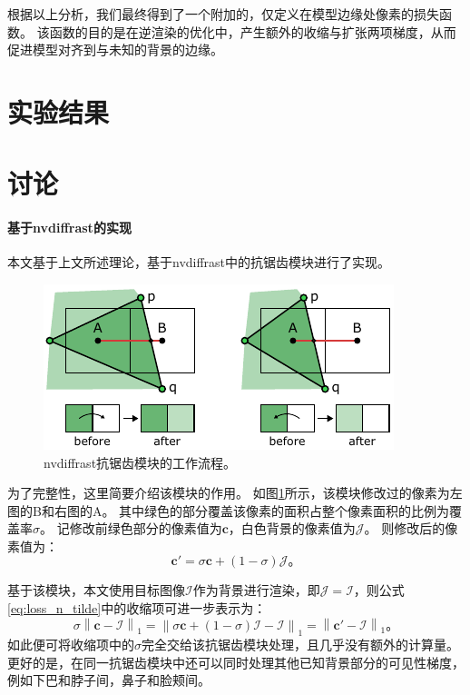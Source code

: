 根据以上分析，我们最终得到了一个附加的，仅定义在模型边缘处像素的损失函数。
该函数的目的是在逆渲染的优化中，产生额外的收缩与扩张两项梯度，从而促进模型对齐到与未知的背景的边缘。

\section{实验结果}


\section{讨论}
\label{sec:method_discuss}

\paragraph{基于nvdiffrast的实现}
本文基于上文所述理论，基于nvdiffrast\citep{nvdiffrast}中的抗锯齿模块进行了实现。

\begin{figure}
    \centering
    \includegraphics{figures/antialias}
    \caption[nvdiffrast抗锯齿模块的工作流程]{nvdiffrast抗锯齿模块的工作流程\citep{nvdiffrast}。}
    \label{fig:aa}
\end{figure}

为了完整性，这里简要介绍该模块的作用。
如图\ref{fig:aa}所示，该模块修改过的像素为左图的B和右图的A。
其中绿色的部分覆盖该像素的面积占整个像素面积的比例为覆盖率$\sigma$。
记修改前绿色部分的像素值为$\mathbf{c}$，白色背景的像素值为$\mathcal{J}$。
则修改后的像素值为：
\begin{equation}
\mathbf{c}' = \sigma\mathbf{c} + (1-\sigma)\mathcal{J}
\text{。}
\end{equation}

基于该模块，本文使用目标图像$\mathcal{I}$作为背景进行渲染，即$\mathcal{J}=\mathcal{I}$，则公式\ref{eq:loss_n_tilde}中的收缩项可进一步表示为：
\begin{equation}
\sigma\left\| \mathbf{c} - \mathcal{I} \right\|_1 =
\left\| \sigma\mathbf{c} + (1-\sigma)\mathcal{I} - \mathcal{I} \right\|_1 =
\left\| \mathbf{c}' - \mathcal{I} \right\|_1
\text{。}
\label{eq:impl_nvdiffrast}
\end{equation}
如此便可将收缩项中的$\sigma$完全交给该抗锯齿模块处理，且几乎没有额外的计算量。
更好的是，在同一抗锯齿模块中还可以同时处理其他已知背景部分的可见性梯度，例如下巴和脖子间，鼻子和脸颊间。

